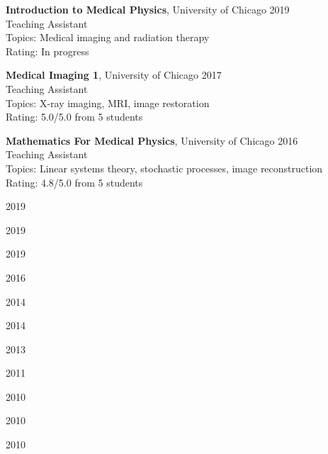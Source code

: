 \documentclass[12pt,letterpaper]{article}
\begin{document}
\begin{benumerate}{3}
\item
  \textbf{Introduction to Medical Physics}, University of Chicago \hfill 2019\\
  Teaching Assistant\\
  Topics: Medical imaging and radiation therapy\\
  Rating: In progress
\item
  \textbf{Medical Imaging 1}, University of Chicago \hfill 2017\\
  Teaching Assistant\\
  Topics: X-ray imaging, MRI, image restoration\\
  Rating: 5.0/5.0 from 5 students
\item
  \textbf{Mathematics For Medical Physics}, University of Chicago \hfill 2016\\
  Teaching Assistant\\
  Topics: Linear systems theory, stochastic processes, image reconstruction\\
  Rating: 4.8/5.0 from 5 students
\end{benumerate}

\begin{mybenumerate}{11}
\item {} \hfill{2019}
\item {} \hfill{2019}
\item {} \hfill{2019}
\item {} \hfill{2016}
\item {} \hfill{2014}
\item {} \hfill{2014}
\item {} \hfill{2013}
\item {} \hfill{2011}
\item {} \hfill{2010}
\item {} \hfill{2010}
\item {} \rtab{-}\hfill{2010}
\end{mybenumerate}
\end{document}
